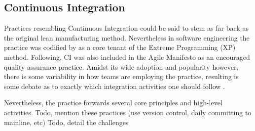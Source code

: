 \documentclass{report}
\begin{document}
\subsection{Continuous Integration}
Practices resembling Continuous Integration could be said
to stem as far back as the original lean manufacturing method. 
Nevertheless in software
engineering the practice was codified by \citet{Beck} 
as a core tenant of the Extreme Programming (XP) method.
Following, CI was also included in the Agile Manifesto as an encouraged
quality assurance practice. Amidst its wide adoption and popularity however, 
there is some variability in how teams are employing the practice, resulting 
is some debate as to exactly which integration activities one should follow \citep{Stahl}.
\par
Nevertheless, the practice forwards several core principles and high-level activities.
Todo, mention these practices (use version control, daily committing to mainline, etc)
Todo, detail the challenges 
\par
\end{document}
